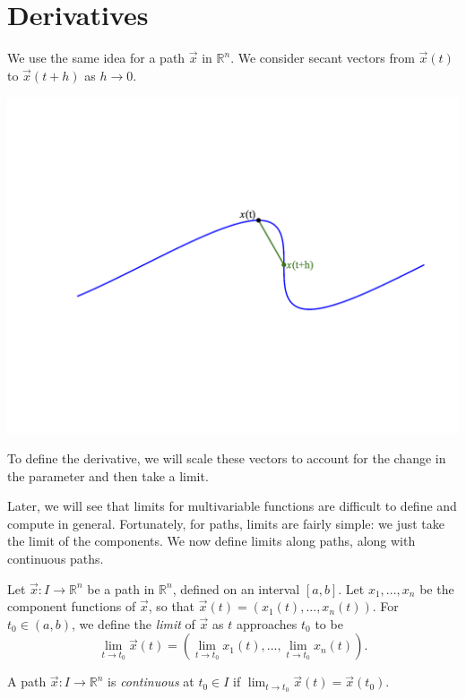 \documentclass{ximera}
\begin{document}
\section*{Derivatives}

We use the same idea for a path $\vec{x}$ in $\mathbb{R}^n$. We consider secant vectors from $\vec{x}(t)$ to $\vec{x}(t+h)$ as $h\rightarrow 0$.

\begin{image}
\includegraphics[width=\textwidth]{CalcPlot3D-curve_deriv}
\end{image}

To define the derivative, we will scale these vectors to account for the change in the parameter and then take a limit.

Later, we will see that limits for multivariable functions are difficult to define and compute in general. Fortunately, for paths, limits are fairly simple: we just take the limit of the components. We now define limits along paths, along with continuous paths.

\begin{definition}
Let $\vec{x}:I\rightarrow\mathbb{R}^n$ be a path in $\mathbb{R}^n$, defined on an interval $[a,b]$. Let $x_1,...,x_n$ be the component functions of $\vec{x}$, so that $\vec{x}(t)=(x_1(t),...,x_n(t))$. For $t_0\in (a,b)$, we define the \emph{limit} of $\vec{x}$ as $t$ approaches $t_0$ to be
\[
\lim_{t\rightarrow t_0}\vec{x}(t) = \left(\lim_{t\rightarrow t_0}x_1(t),...,\lim_{t\rightarrow t_0}x_n(t)\right).
\]

A path $\vec{x}:I\rightarrow\mathbb{R}^n$ is \emph{continuous} at $t_0\in I$ if $\lim_{t\rightarrow t_0}\vec{x}(t) = \vec{x}(t_0)$.
\end{definition}
\end{document}
